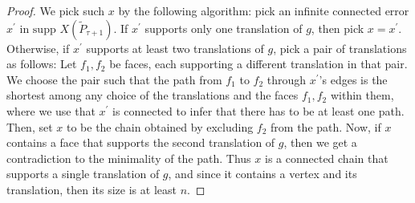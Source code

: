 \begin{proof}
We pick such $x$ by the following algorithm: pick an infinite connected error $x^{\prime}$ in $\text{supp } X(\tilde{P}_{\tau+1})$. If $x^{\prime}$ supports only one translation of $g$, then pick $x=x^{\prime}$. Otherwise, if $x^{\prime}$ supports at least two translations of $g$, pick a pair of translations as follows: Let $f_{1}, f_{2}$ be faces, each supporting a different translation in that pair. We choose the pair such that the path from $f_{1}$ to $f_{2}$ through $x^{\prime}$'s edges is the shortest among any choice of the translations and the faces $f_{1}, f_{2}$ within them, where we use that $x^{\prime}$ is connected to infer that there has to be at least one path. Then, set $x$ to be the chain obtained by excluding $f_{2}$ from the path. Now, if $x$ contains a face that supports the second translation of $g$, then we get a contradiction to the minimality of the path. Thus $x$ is a connected chain that supports a single translation of $g$, and since it contains a vertex and its translation, then its size is at least $n$.
\end{proof}










